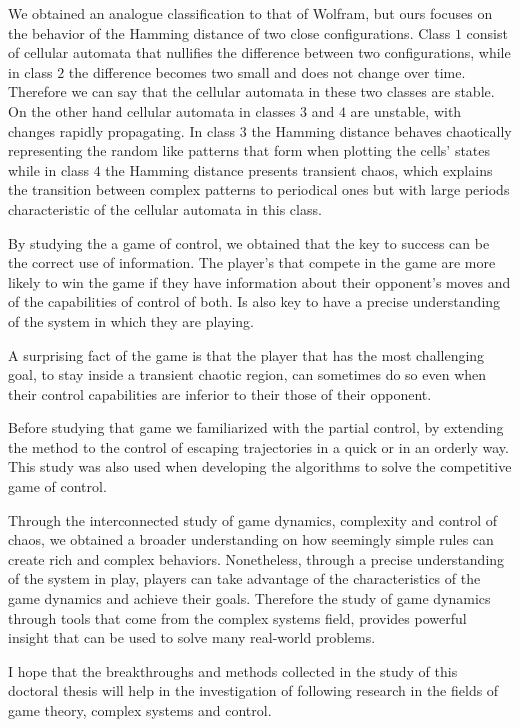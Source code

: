 We obtained an analogue classification to that of Wolfram, but ours focuses on the behavior of the Hamming distance of two close configurations. Class $1$ consist of cellular automata that nullifies the difference between two configurations, while in class $2$ the difference becomes two small and does not change over time. Therefore we can say that the cellular automata in these two classes are stable. On the other hand cellular automata in classes $3$ and $4$ are unstable, with changes rapidly propagating. In class $3$ the Hamming distance behaves chaotically representing the random like patterns that form when plotting the cells' states while in class $4$ the Hamming distance presents transient chaos, which explains the transition between complex patterns to periodical ones but with large periods characteristic of the cellular automata in this class.

By studying the a game of control, we obtained that the key to success can be the correct use of information. The player's that compete in the game are more likely to win the game if they have information about their opponent's moves and of the capabilities of control of both. Is also key to have a precise understanding of the system in which they are playing.


A surprising fact of the game is that the player that has the most challenging goal, to stay inside a transient chaotic region, can sometimes do so even when their control capabilities are inferior to their those of their opponent.

Before studying that game we familiarized with the partial control, by extending the method to the control of escaping trajectories in a quick or in an orderly way. This study was also used when developing the algorithms to solve the competitive game of control. 


Through the interconnected study of game dynamics, complexity and control of chaos, we obtained a broader understanding on how seemingly simple rules can create rich and complex behaviors. Nonetheless, through a precise understanding of the system in play, players can take advantage of the characteristics of the game dynamics and achieve their goals. Therefore the study of game dynamics through tools that come from the complex systems field, provides powerful insight that can be used to solve many real-world problems.

I hope that the breakthroughs and methods collected in the study of this doctoral thesis will help in the investigation of following research in the fields of game theory, complex systems and control.

